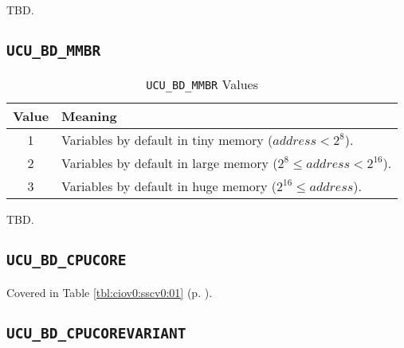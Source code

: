 TBD.


\subsection{\texttt{UCU\_BD\_MMBR}}
\label{cbpc0:sbpd0:smmr0}

\begin{table}
\caption{\texttt{UCU\_BD\_MMBR} Values}
\label{tbl:cbpc0:sbpd0:smmr0:01}
\begin{center}
\begin{tabular}{|c|l|}
\hline
Value         & Meaning                                                                  \\
\hline
\hline
1             & Variables by default in tiny  memory ($address < 2^8$).                  \\
\hline
2             & Variables by default in large memory ($2^8 \leq address < 2^{16}$).      \\
\hline
3             & Variables by default in huge  memory ($2^{16} \leq address$).            \\
\hline
\end{tabular}
\end{center}
\end{table}

TBD.


\subsection{\texttt{UCU\_BD\_CPUCORE}}
\label{cbpc0:sbpd0:scpc0}

Covered in Table \ref{tbl:ciov0:sscv0:01} (p. \pageref{tbl:ciov0:sscv0:01}).


\subsection{\texttt{UCU\_BD\_CPUCOREVARIANT}}
\label{cbpc0:sbpd0:sccv0}

